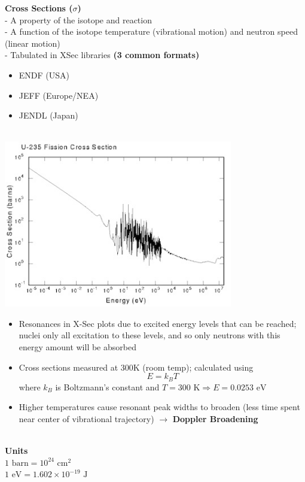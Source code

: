 \documentclass{report}
\newcommand{\tab}{\-\hspace{1cm}}
\newcommand{\xs}{\sigma}
\begin{document}
\textbf{Cross Sections ($\xs$)}\\
- A property of the isotope and reaction\\
- A function of the isotope temperature (vibrational motion) and neutron speed (linear motion)\\
- Tabulated in XSec libraries \textbf{(3 common formats)}
\begin{itemize}
    \item ENDF (USA)
    \item JEFF (Europe/NEA)
    \item JENDL (Japan)
\end{itemize}

\-\\
\includegraphics[width=10cm]{Lecture01_U235-Xsec}
\-\\

\begin{itemize}
    \item Resonances in X-Sec plots due to excited energy levels that can be reached; nuclei only all excitation to these levels, and so only neutrons with this energy amount will be absorbed
    \item Cross sections measured at 300K (room temp); calculated using
	$$ E = k_BT $$ where $k_B$ is Boltzmann's constant and $T=300 \text{ K} \Rightarrow E = 0.0253 \text{ eV}$
    \item Higher temperatures cause resonant peak widths to broaden (less time spent near center of vibrational trajectory) $\rightarrow$ \textbf{Doppler Broadening}
\end{itemize}
\-\\
\textbf{Units}\\
\tab $1 \text{ barn} = 10^{24} \text{ cm}^2$ \\ 
\tab $1 \text{ eV} = 1.602 \times 10^{-19} \text{ J}$
\end{document}
